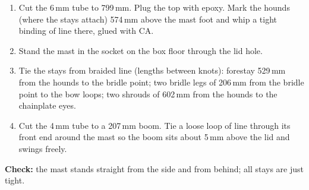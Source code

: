 \documentclass[11pt]{article}
\newcommand{\chk}[1]{\par\noindent\textbf{Check:} #1\par}
\begin{document}
\begin{enumerate}
\item Cut the 6\,mm tube to 799\,mm. Plug the top with epoxy. Mark the hounds (where the stays attach) 574\,mm above the mast foot and whip a tight binding of line there, glued with CA.
\item Stand the mast in the socket on the box floor through the lid hole.
\item Tie the stays from braided line (lengths between knots): forestay 529\,mm from the hounds to the bridle point; two bridle legs of 206\,mm from the bridle point to the bow loops; two shrouds of 602\,mm from the hounds to the chainplate eyes.
\item Cut the 4\,mm tube to a 207\,mm boom. Tie a loose loop of line through its front end around the mast so the boom sits about 5\,mm above the lid and swings freely.
\end{enumerate}
\chk{the mast stands straight from the side and from behind; all stays are just tight.}
\end{document}
